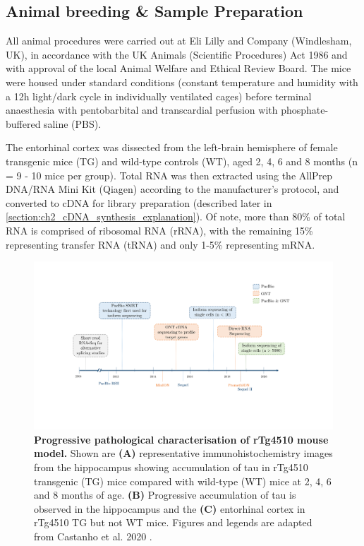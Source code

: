 \subsection{Animal breeding \& Sample Preparation}
\label{sec: animalbreeding_sample preparation}
All animal procedures were carried out at Eli Lilly and Company (Windlesham, UK), in accordance with the UK Animals (Scientific Procedures) Act 1986 and with approval of the local Animal Welfare and Ethical Review Board. The mice were housed under standard conditions (constant temperature and humidity with a 12h light/dark cycle in individually ventilated cages) before terminal anaesthesia with pentobarbital and transcardial perfusion with phosphate-buffered saline (PBS)\cite{Castanho2020}.

The entorhinal cortex was dissected from the left-brain hemisphere of female transgenic mice (TG) and wild-type controls (WT), aged 2, 4, 6 and 8 months (n = 9 - 10 mice per group). Total RNA was then extracted\cite{Castanho2020} using the AllPrep DNA/RNA Mini Kit (Qiagen) according to the manufacturer's protocol, and converted to cDNA for library preparation (described later in \cref{section:ch2_cDNA_synthesis_explanation}). Of note, more than 80\% of total RNA is comprised of ribosomal RNA (rRNA), with the remaining 15\% representing transfer RNA (tRNA) and only 1-5\% representing mRNA. 

\begin{landscape}
	\begin{figure}[htp]
		\centering
		\vspace{20pt}
		\includegraphics[page=3,trim={0 7cm 0 0 },clip, scale = 0.7]{Figures/Introduction_Figures_Landscape.pdf}
		\captionsetup{width=1.5\textwidth}
		\caption[Progressive pathological characterisation of rTg4510 mouse model]%
		{\textbf{Progressive pathological characterisation of rTg4510 mouse model.} Shown are \textbf{(A)} representative immunohistochemistry images from the hippocampus showing accumulation of tau in rTg4510 transgenic (TG) mice compared with wild-type (WT) mice at 2, 4, 6 and 8 months of age. \textbf{(B)} Progressive accumulation of tau is observed in the hippocampus and the \textbf{(C)} entorhinal cortex in rTg4510 TG but not WT mice. Figures and legends are adapted from Castanho et al. 2020 \cite{Castanho2020}.}
		\label{fig:immunohistochemistry}
	\end{figure}	
\end{landscape}


